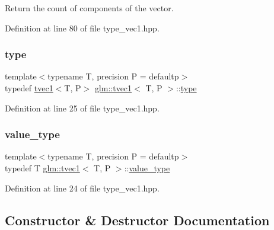Return the count of components of the vector. 



Definition at line 80 of file type\+\_\+vec1.\+hpp.

\mbox{\label{structglm_1_1tvec1_a6f4d9547de6a649e654f93ffa832d9c2}} 
\subsubsection{\texorpdfstring{type}{type}}
{\footnotesize\ttfamily template$<$typename T, precision P = defaultp$>$ \\
typedef \mbox{\hyperlink{structglm_1_1tvec1}{tvec1}}$<$T, P$>$ \mbox{\hyperlink{structglm_1_1tvec1}{glm\+::tvec1}}$<$ T, P $>$\+::\mbox{\hyperlink{structglm_1_1tvec1_a6f4d9547de6a649e654f93ffa832d9c2}{type}}}



Definition at line 25 of file type\+\_\+vec1.\+hpp.

\mbox{\label{structglm_1_1tvec1_a7dd28a7610830a30c358090bde66c848}} 
\subsubsection{\texorpdfstring{value\_type}{value\_type}}
{\footnotesize\ttfamily template$<$typename T, precision P = defaultp$>$ \\
typedef T \mbox{\hyperlink{structglm_1_1tvec1}{glm\+::tvec1}}$<$ T, P $>$\+::\mbox{\hyperlink{structglm_1_1tvec1_a7dd28a7610830a30c358090bde66c848}{value\+\_\+type}}}



Definition at line 24 of file type\+\_\+vec1.\+hpp.



\subsection{Constructor \& Destructor Documentation}
\mbox{\label{structglm_1_1tvec1_a7bc48ef6909364ad20e31831fa819bd8}} 
